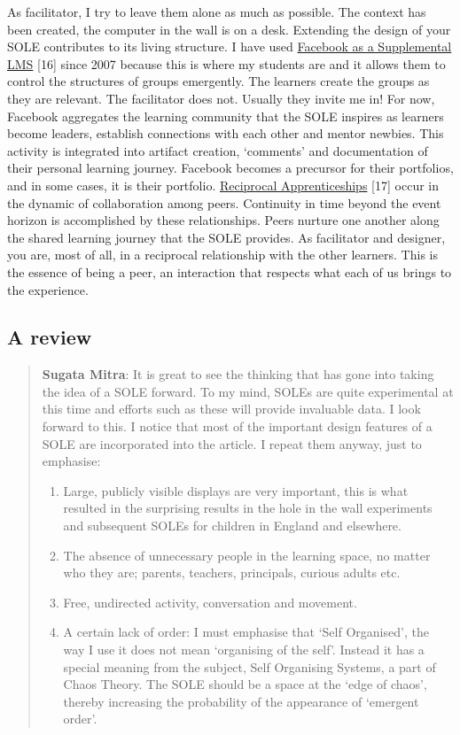 As facilitator, I try to leave them alone as much
as possible. The context has been created, the computer in the wall is
on a desk. Extending the design of your SOLE contributes to its living
structure. I have used
\href{http://community.telecentre.org/profiles/blogs/facebook-as-a-supplemental-lms}{Facebook
as a Supplemental LMS} {[}16{]} since 2007 because this is where my
students are and it allows them to control the structures of groups
emergently. The learners create the groups as they are relevant. The
facilitator does not. Usually they invite me in! For now, Facebook
aggregates the learning community that the SOLE inspires as learners
become leaders, establish connections with each other and mentor
newbies. This activity is integrated into artifact creation, `comments'
and documentation of their personal learning journey. Facebook becomes a
precursor for their portfolios, and in some cases, it is their
portfolio.
\href{http://starwars.wikia.com/wiki/Reciprocal\_apprenticeship}{Reciprocal
Apprenticeships} {[}17{]} occur in the dynamic of collaboration among
peers. Continuity in time beyond the event horizon is accomplished by
these relationships. Peers nurture one another along the shared learning
journey that the SOLE provides. As facilitator and designer, you are,
most of all, in a reciprocal relationship with the other learners. This
is the essence of being a peer, an interaction that respects what each
of us brings to the experience.

\subsection{A review}

\begin{quote}
\textbf{Sugata Mitra}: It is great to see the thinking that has gone into taking the idea of a SOLE forward. To my mind, SOLEs are quite experimental at this time and efforts such as these will provide invaluable data. I look forward to this. I notice that most of the important design features of a SOLE are incorporated into the article. I repeat them anyway, just to emphasise:
\begin{enumerate}
\item Large, publicly visible displays are very important, this is what resulted in the surprising results in the hole in the wall experiments and subsequent SOLEs for children in England and elsewhere.
\item The absence of unnecessary people in the learning space, no matter who they are; parents, teachers, principals, curious adults etc.
\item Free, undirected activity, conversation and movement.
\item A certain lack of order: I must emphasise that ‘Self Organised’, the way I use it does not mean ‘organising of the self’. Instead it has a special meaning from the subject, Self Organising Systems, a part of Chaos Theory. The SOLE should be a space at the ‘edge of chaos’, thereby increasing the probability of the appearance of ‘emergent order’.
\end{enumerate}
\end{quote}

